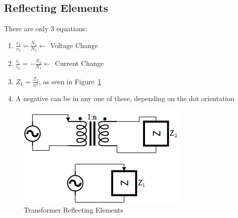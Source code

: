 \documentclass[10pt,letterpaper,final,twoside,notitlepage]{article}
\begin{document}
	\subsection*{Reflecting Elements} \label{subsec:Element Reflection}
		There are only 3 equations:
		\begin{enumerate}
			\item $\frac{v_{1}}{v_{2}} = \frac{N_{1}}{N_{2}} \longleftarrow$ Voltage Change
			\item $\frac{i_{1}}{i_{2}} = -\frac{N_{2}}{N_{1}} \longleftarrow$ Current Change
			\item $Z_{1} = \frac{Z_{2}}{n^{2}}$, as seen in Figure~\ref{fig:Transformer Reflecting}
			\item A negative can be in any one of these, depending on the dot orientation
		\end{enumerate}
		\begin{figure}[ht!]
			\centering
			\includegraphics[scale=0.375]{Transformer_Reflecting.png}
			\caption{Transformer Reflecting Elements}
			\label{fig:Transformer Reflecting}
		\end{figure}
		\vspace{-10mm}
	


\clearpage





\end{document}
